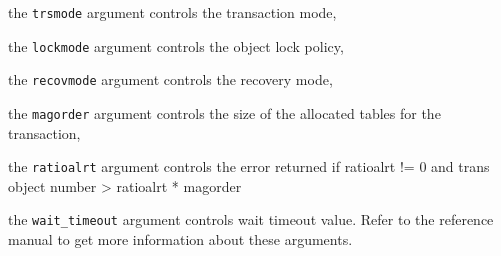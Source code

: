 \be
\item the \texttt{trsmode} argument controls the transaction mode,
\item the \texttt{lockmode} argument controls the object lock policy,
\item the \texttt{recovmode} argument controls the recovery mode,
\item the \texttt{magorder} argument controls the size of the allocated
tables for the transaction,
\item the \texttt{ratioalrt} argument controls the  error returned if
ratioalrt != 0 and trans object number > ratioalrt * magorder
\item the \texttt{wait\_timeout} argument controls 
wait timeout value.
\ee
Refer to the reference manual to get more information about these arguments.

